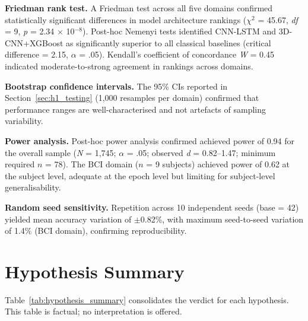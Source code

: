 \textbf{Friedman rank test.} A Friedman test across all five domains confirmed statistically significant differences in model architecture rankings ($\chi^2$ = 45.67, \textit{df} = 9, \textit{p} = 2.34 $\times$ 10$^{-8}$). Post-hoc Nemenyi tests identified CNN-LSTM and 3D-CNN+XGBoost as significantly superior to all classical baselines (critical difference = 2.15, $\alpha$ = .05). Kendall's coefficient of concordance \textit{W} = 0.45 indicated moderate-to-strong agreement in rankings across domains.

\textbf{Bootstrap confidence intervals.} The 95\% CIs reported in Section~\ref{sec:h1_testing} (1,000 resamples per domain) confirmed that performance ranges are well-characterised and not artefacts of sampling variability.

\textbf{Power analysis.} Post-hoc power analysis confirmed achieved power of 0.94 for the overall sample (\textit{N} = 1,745; $\alpha$ = .05; observed \textit{d} = 0.82--1.47; minimum required $n$ = 78). The BCI domain ($n$ = 9 subjects) achieved power of 0.62 at the subject level, adequate at the epoch level but limiting for subject-level generalisability.

\textbf{Random seed sensitivity.} Repetition across 10 independent seeds (base = 42) yielded mean accuracy variation of $\pm$0.82\%, with maximum seed-to-seed variation of 1.4\% (BCI domain), confirming reproducibility.


\section{Hypothesis Summary}
\label{sec:hypothesis_summary}

Table~\ref{tab:hypothesis_summary} consolidates the verdict for each hypothesis. This table is factual; no interpretation is offered.

